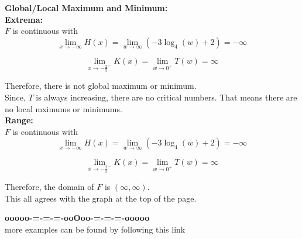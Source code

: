 \documentclass{ximera}
\begin{document}
\textbf{\textcolor{blue!55!black}{Global/Local Maximum and Minimum:}} \\
\textbf{Extrema:} \\

$F$ is continuous with \\




\[
\lim\limits_{x \to -\infty} H(x)  = \lim\limits_{w \to \infty} (-3 \log_4(w) + 2)  = -\infty
\]



\[
\lim\limits_{x \to -\frac{2}{5}^-} K(x)  = \lim\limits_{w \to 0^+} T(w) = \infty
\]


Therefore, there is not global maximum or minimum. \\


Since, $T$ is always increasing, there are no critical numbers.  That means there are no local mximums or minimums. \\












\textbf{\textcolor{blue!55!black}{Range:}} \\


$F$ is continuous with \\




\[
\lim\limits_{x \to -\infty} H(x)  = \lim\limits_{w \to \infty} (-3 \log_4(w) + 2)  = -\infty
\]



\[
\lim\limits_{x \to -\frac{2}{5}^-} K(x)  = \lim\limits_{w \to 0^+} T(w) = \infty
\]


Therefore, the domain of $F$ is $(\infty, \infty)$.\\





This all agrees with the graph at the top of the page. 






















\begin{center}
\textbf{\textcolor{green!50!black}{ooooo-=-=-=-ooOoo-=-=-=-ooooo}} \\

more examples can be found by following this link\\ 

\end{center}
\end{document}
